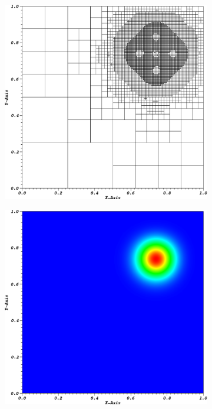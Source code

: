 \begin{figure}
{\begin{subfigure}[b]{0.485\textwidth}
		\caption{}
	\end{subfigure}
}
\vspace{1cm}
{
	\begin{subfigure}[b]{0.485\textwidth}
		\centering
		\label{subfig::AMR_GQ_ME2_mesh}
		\includegraphics[width=\textwidth]{figures/sec_BF/ME2_cart_Irr=1_cyc08_mesh.eps}
		\caption{}
	\end{subfigure}
	\hfill
	\begin{subfigure}[b]{0.485\textwidth}
		\centering
		\label{subfig::AMR_GQ_ME2_sol}
		\includegraphics[width=\textwidth]{figures/sec_BF/ME2_cart_Irr=1_cyc08_sol.eps}

\end{subfigure}}
\end{figure}
